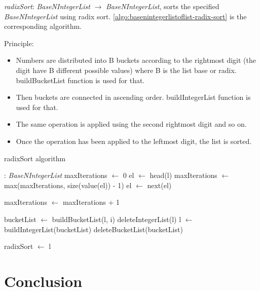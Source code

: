 \documentclass[book, nodocumentinfo]{upmethodology-document}
\begin{document}
\emph{radixSort}: \emph{BaseNIntegerList} \(\rightarrow\) \emph{BaseNIntegerList},
sorts the specified \emph{BaseNIntegerList} using radix sort.
\ref{algo:basenintegerlistoflist-radix-sort} is the corresponding algorithm.

Principle:
\begin{itemize}
    \item Numbers are distributed into B buckets according to the rightmost
        digit (the digit have B different possible values)
        where B is the list base or radix.
        buildBucketList function is used for that.
    \item Then buckets are connected in ascending order.
        buildIntegerList function is used for that.
    \item The same operation is applied using the second rightmost digit and so on.
    \item Once the operation has been applied to the leftmost digit, the list is sorted.
\end{itemize}

\begin{algorithm}[H]
    \caption{radixSort algorithm}
    \label{algo:basenintegerlistoflist-radix-sort}

    \begin{algorithmic}
         : \emph{BaseNIntegerList}
            \State maxIterations \(\leftarrow\) 0
            \State el \(\leftarrow\) head(l)
                \State maxIterations \(\leftarrow\) max(maxIterations, size(value(el)) - 1)
                \State el \(\leftarrow\) next(el)
            \EndWhile

            \State maxIterations \(\leftarrow\) maxIterations + 1

                \State bucketList \(\leftarrow\) buildBucketList(l, i)
                \State deleteIntegerList(l)
                \State l \(\leftarrow\) buildIntegerList(bucketList)
                \State deleteBucketList(bucketList)
            \EndFor

            \State radixSort \(\leftarrow\) l
        \EndFunction
    \end{algorithmic}
\end{algorithm}

\chapter{Conclusion}
\end{document}
